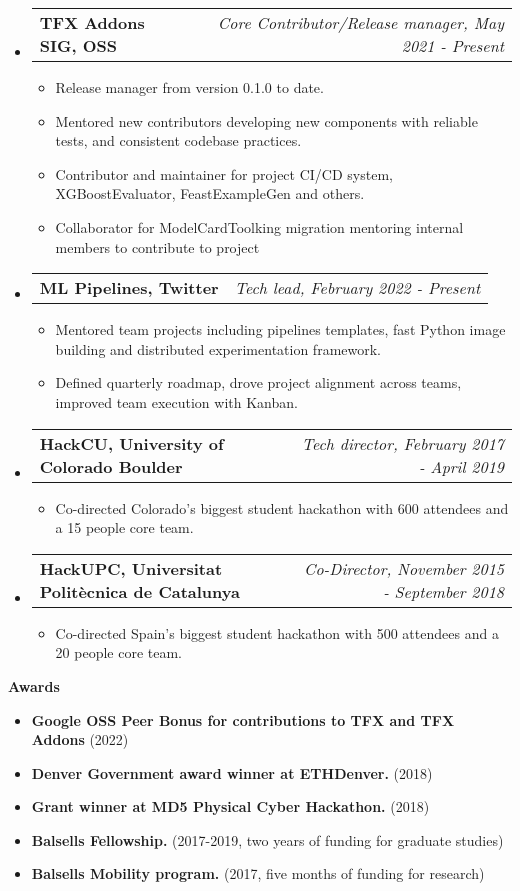 \documentclass[letterpaper,10pt]{article}
\makeatletter
\newcommand{\resitem}[1]{\item #1 \vspace{-2pt}}
\newcommand{\resheading}[1]{{\large \colorbox{mygrey}{\begin{minipage}{\textwidth}{\textbf{#1 \vphantom{p\^{E}}}}\end{minipage}}}}
\newcommand{\ressubheading}[4]{
\begin{tabular*}{7.0in}{l@{\extracolsep{\fill}}r}
		\textbf{#1} & \textit{#4} \\
\end{tabular*}\vspace{-6pt}}
\makeatother
\begin{document}
	\begin{itemize}
	    \item 
		\ressubheading{TFX Addons SIG, OSS}{Boulder, CO}{Core Contributor}{Core Contributor/Release manager, May 2021 - Present}
			\begin{itemize}
				\resitem{Release manager from version 0.1.0 to date.}
				\resitem{Mentored new contributors developing new components with reliable tests, and consistent codebase practices.}
				\resitem{Contributor and maintainer for project CI/CD system, XGBoostEvaluator, FeastExampleGen and others.}
				\resitem{Collaborator for ModelCardToolking migration mentoring internal members to contribute to project} 
			\end{itemize}
	    \item 
			\ressubheading{ML Pipelines, Twitter}{Boulder, CO}{Tech Lead}{Tech lead, February 2022 - Present}
			\begin{itemize}
				\resitem{Mentored team projects including pipelines templates, fast Python image building and distributed experimentation framework.}
				\resitem{Defined quarterly roadmap, drove project alignment across teams, improved team execution with Kanban.}
			\end{itemize}
		\item 
			\ressubheading{HackCU, University of Colorado Boulder}{Boulder, CO}{Tech director}{Tech director, February 2017 - April 2019}
			\begin{itemize}
				\resitem{Co-directed Colorado's biggest student hackathon with 600 attendees and a 15 people core team.}
			\end{itemize}
		\item
			\ressubheading{HackUPC, Universitat Polit\`ecnica de Catalunya}{Barcelona, Spain}{Co-Director and organizer}{Co-Director, November 2015 - September 2018}
			\begin{itemize}
				\resitem{Co-directed Spain's biggest student hackathon with 500 attendees and a 20 people core team.}
			\end{itemize}
	\end{itemize}

\resheading{Awards}
	\begin{itemize}
		\resitem{\textbf{Google OSS Peer Bonus for contributions to TFX and TFX Addons} (2022)}
		\resitem{\textbf{Denver Government award winner at ETHDenver.} (2018)}
		\resitem{\textbf{Grant winner at MD5 Physical Cyber Hackathon.} (2018)}
		\resitem{\textbf{Balsells Fellowship.} (2017-2019, two years of funding for graduate studies)}
		\resitem{\textbf{Balsells Mobility program.} (2017, five months of funding for research)}
	\end{itemize}
\end{document}
